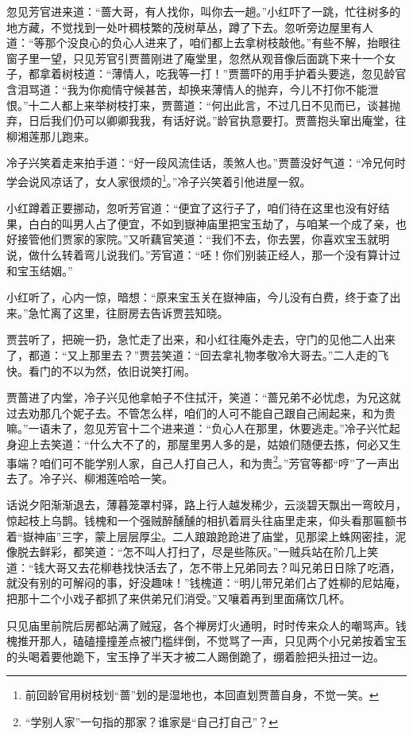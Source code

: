 \documentclass[12pt,oneside]{book}
\begin{document}
忽见芳官进来道：“蔷大哥，有人找你，叫你去一趟。”小红吓了一跳，忙往树多的地方藏，不觉找到一处叶稠枝繁的茂树草丛，蹲了下去。忽听旁边屋里有人道：“等那个没良心的负心人进来了，咱们都上去拿树枝敲他。”有些不解，抬眼往窗子里一望，只见芳官引贾蔷刚进了庵堂里，忽然从观音像后面跳下来十一个女子，都拿着树枝道：“薄情人，吃我等一打！”贾蔷吓的用手护着头要逃，忽见龄官含泪骂道：“我为你痴情守候甚苦，却换来薄情人的抛弃，今儿不打你不能泄恨。”十二人都上来举树枝打来，贾蔷道：“何出此言，不过几日不见而已，谈甚抛弃，日后我们仍可以卿卿我我，有话好说。”龄官执意要打。贾蔷抱头窜出庵堂，往柳湘莲那儿跑来。

冷子兴笑着走来拍手道：“好一段风流佳话，羡煞人也。”贾蔷没好气道：“冷兄何时学会说风凉话了，女人家很烦的\footnote{前回龄官用树枝划“蔷”划的是湿地也，本回直划贾蔷自身，不觉一笑。}。”冷子兴笑着引他进屋一叙。

小红蹲着正要挪动，忽听芳官道：“便宜了这行子了，咱们待在这里也没有好结果，白白的叫男人占了便宜，不如到嶽神庙里把宝玉劫了，与咱某一个成了亲，也好接管他们贾家的家院。”又听藕官笑道：“我们不去，你去罢，你喜欢宝玉就明说，做什么转着弯儿说我们。”芳官道：“呸！你们别装正经人，那一个没有算计过和宝玉结姻。”

小红听了，心内一惊，暗想：“原来宝玉关在嶽神庙，今儿没有白费，终于查了出来。”急忙离了这里，往厨房去告诉贾芸知晓。

贾芸听了，把碗一扔，急忙走了出来，和小红往庵外走去，守门的见他二人出来了，都道：“又上那里去？”贾芸笑道：“回去拿礼物孝敬冷大哥去。”二人走的飞快。看门的不以为然，依旧说笑打闹。

贾蔷进了内堂，冷子兴见他拿帕子不住拭汗，笑道：“蔷兄弟不必忧虑，为兄这就过去劝那几个妮子去。不管怎么样，咱们的人可不能自己跟自己闹起来，和为贵嘛。”一语未了，忽见芳官十二个进来道：“负心人在那里，休要逃走。”冷子兴忙起身迎上去笑道：“什么大不了的，那屋里男人多的是，姑娘们随便去拣，何必又生事端？咱们可不能学别人家，自己人打自己人，和为贵\footnote{“学别人家”一句指的那家？谁家是“自己打自己”？}。”芳官等都“哼”了一声出去了。冷子兴、柳湘莲哈哈一笑。

话说夕阳渐渐退去，薄暮笼罩村驿，路上行人越发稀少，云淡碧天飘出一弯皎月，惊起枝上乌鹊。钱槐和一个强贼醉醺醺的相扒着肩头往庙里走来，仰头看那匾额书着“嶽神庙”三字，蒙上层层厚尘。二人踉踉跄跄进了庙堂，见那梁上蛛网密挂，泥像脱去鲜彩，都笑道：“怎不叫人打扫了，尽是些陈灰。”一贼兵站在阶几上笑道：“钱大哥又去花柳巷找快活去了，怎不带上兄弟同去？叫兄弟日日除了吃酒，就没有别的可解闷的事，好没趣味！”钱槐道：“明儿带兄弟们占了姓柳的尼姑庵，把那十二个小戏子都抓了来供弟兄们消受。”又嚷着再到里面痛饮几杯。

只见庙里前院后房都站满了贼寇，各个禅房灯火通明，时时传来众人的嘲骂声。钱槐推开那人，磕磕撞撞差点被门槛绊倒，不觉骂了一声，只见两个小兄弟按着宝玉的头喝着要他跪下，宝玉挣了半天才被二人踢倒跪了，绷着脸把头扭过一边。
\end{document}
